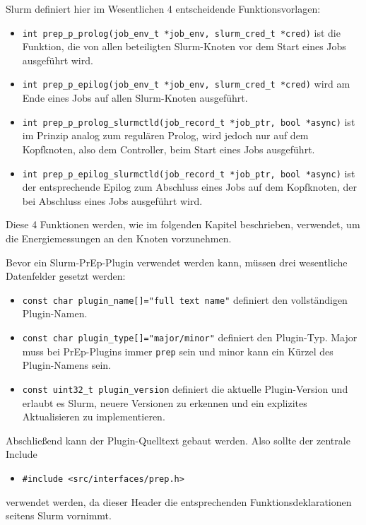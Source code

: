 \documentclass[paper=a4, fontsize=11pt]{scrartcl} %
\numberwithin{equation}{section} %
\numberwithin{figure}{section} %
\numberwithin{table}{section} %
\begin{document}
Slurm definiert hier im Wesentlichen 4 entscheidende Funktionsvorlagen:
\begin{itemize}
    \item \texttt{int prep_p_prolog(job_env_t *job_env, slurm_cred_t *cred)} ist die Funktion, die von allen beteiligten Slurm-Knoten vor dem Start eines Jobs ausgeführt wird.
    \item \texttt{int prep_p_epilog(job_env_t *job_env, slurm_cred_t *cred)} wird am Ende eines Jobs auf allen Slurm-Knoten ausgeführt.
    \item \texttt{int prep_p_prolog_slurmctld(job_record_t *job_ptr, bool *async)} \newline ist im Prinzip analog zum regulären Prolog, wird jedoch nur auf dem Kopfknoten, also dem Controller, beim Start eines Jobs ausgeführt.
    \item \texttt{int prep_p_epilog_slurmctld(job_record_t *job_ptr, bool *async)} \newline ist der entsprechende Epilog zum Abschluss eines Jobs auf dem Kopfknoten, der bei Abschluss eines Jobs ausgeführt wird.
\end{itemize}
Diese 4 Funktionen werden, wie im folgenden Kapitel beschrieben, verwendet, um die Energiemessungen an den Knoten vorzunehmen.

Bevor ein Slurm-PrEp-Plugin verwendet werden kann, müssen drei wesentliche Datenfelder gesetzt werden:
\begin{itemize}
    \item \texttt{const char plugin_name[]="full text name"} definiert den vollständigen Plugin-Namen.
    \item \texttt{const char plugin_type[]="major/minor"} definiert den Plugin-Typ. Major muss bei PrEp-Plugins immer \texttt{prep} sein und minor kann ein Kürzel des Plugin-Namens sein.
    \item \texttt{const uint32_t plugin_version} definiert die aktuelle Plugin-Version und erlaubt es Slurm, neuere Versionen zu erkennen und ein explizites Aktualisieren zu implementieren.
\end{itemize}
Abschließend kann der Plugin-Quelltext gebaut werden. Also sollte der zentrale Include 
\begin{itemize}
    \item \texttt{#include <src/interfaces/prep.h>}
\end{itemize} verwendet werden, da dieser Header die entsprechenden Funktionsdeklarationen seitens Slurm vornimmt.
\end{document}
